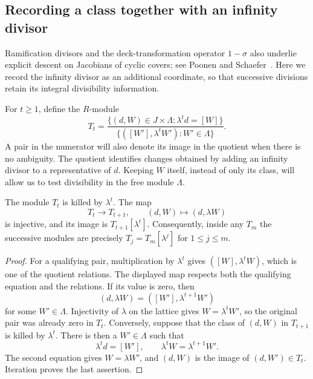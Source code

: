 \subsection{Recording a class together with an infinity divisor}

Ramification divisors and the deck-transformation operator $1-\sigma$
also underlie explicit
descent on Jacobians of cyclic covers; see
Poonen and Schaefer~\cite[Section 6, Proposition 6.2]{PoonenSchaefer97}.
Here we record the infinity divisor as an additional coordinate, so that
successive divisions retain its integral divisibility information.

For $t\ge1$, define the $R$-module
\begin{equation}
 T_t=
 \frac{\{(d,W)\in J\times\Lambda:\lambda^t d=[W]\}}
      {\{([W'],\lambda^t W'):W'\in\Lambda\}}.
\label{geom:T-definition}
\end{equation}
A pair in the numerator will also denote its image in the quotient when
there is no ambiguity.  The quotient identifies changes obtained by adding
an infinity divisor to a representative of $d$.  Keeping $W$ itself,
instead of only its class, will allow us to test divisibility in the free
module $\Lambda$.

\begin{lemma}
\label{geom:filtration}
The module $T_t$ is killed by $\lambda^t$.  The map
\[
             T_t\longrightarrow T_{t+1},\qquad
             (d,W)\longmapsto(d,\lambda W)
\]
is injective, and its image is $T_{t+1}[\lambda^t]$.
Consequently, inside any $T_m$ the successive modules are precisely
$T_j=T_m[\lambda^j]$ for $1\le j\le m$.
\end{lemma}

\begin{proof}
For a qualifying pair, multiplication by $\lambda^t$ gives
$([W],\lambda^t W)$, which is one of the quotient relations.
The displayed map respects both the qualifying equation and the relations.
If its value is zero, then
\[
             (d,\lambda W)=([W'],\lambda^{t+1}W')
\]
for some $W'\in\Lambda$.  Injectivity of $\lambda$ on the lattice gives
$W=\lambda^tW'$, so the original pair was already zero in $T_t$.
Conversely, suppose that the class of $(d,W)$ in $T_{t+1}$ is killed by
$\lambda^t$.  There is then a $W'\in\Lambda$ such that
\[
       \lambda^t d=[W'],\qquad
       \lambda^t W=\lambda^{t+1}W'.
\]
The second equation gives $W=\lambda W'$, and $(d,W)$ is the image of
$(d,W')\in T_t$.  Iteration proves the last assertion.
\end{proof}

